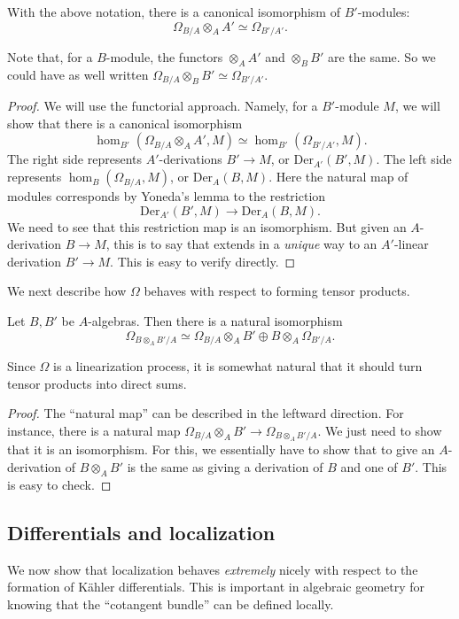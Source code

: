 \begin{proposition} \label{basechangediff} With the above notation, there is a canonical isomorphism
of $B'$-modules:
\[ \Omega_{B/A} \otimes_A A' \simeq \Omega_{B'/A'}.  \]
\end{proposition} 
Note that, for a $B$-module, the functors $\otimes_A A'$ and $\otimes_B B'$ are
the same. So we could have as well written $\Omega_{B/A} \otimes_B B' \simeq
\Omega_{B'/A'}$.
\begin{proof} 
We will use the functorial approach. Namely, for a $B'$-module $M$, we will
show that there is a canonical isomorphism
\[ \hom_{B'}( \Omega_{B/A} \otimes_A A', M) \simeq 
\hom_{B'}( \Omega_{B'/A'}, M) .
\]
The right side represents $A'$-derivations $B' \to M$, or $\mathrm{Der}_{A'}(B', M)$.
The left side represents $\hom_B(\Omega_{B/A}, M)$, or $\mathrm{Der}_A(B, M)$.
Here the natural map of modules corresponds by Yoneda's lemma to the restriction
\[ \mathrm{Der}_{A'}(B', M) \to \mathrm{Der}_A(B, M).  \]
We need to see that this restriction map is an isomorphism. But given an
$A$-derivation $B \to M$, this is to say that extends in a \emph{unique} way to
an $A'$-linear derivation $B' \to M$. This is easy to verify directly.
\end{proof} 

We next describe how $\Omega$ behaves with respect to forming tensor products.
\begin{proposition} 
Let $B, B'$ be $A$-algebras. Then there is a natural isomorphism
\[ \Omega_{B \otimes_A B'/A} \simeq \Omega_{B/A} \otimes_A B' \oplus B
\otimes_A \Omega_{B'/A} .  \]
\end{proposition}
Since $\Omega$ is a linearization process, it is somewhat natural that it
should turn tensor products into direct sums. 
\begin{proof} 
The ``natural map'' can be described in the leftward direction. For instance,
there is a natural map $\Omega_{B/A} \otimes_A B' \to \Omega_{B \otimes_A
B'/A}$. We just need to show that it is an isomorphism. 
For this, we essentially have to show that to give an $A$-derivation of $B
\otimes_A B'$ is the same as giving a derivation of $B$ and one of $B'$. This
is easy to check.
\end{proof} 

\subsection{Differentials and localization}
We now show that localization behaves \emph{extremely} nicely with respect to
the formation of K\"ahler differentials. This is important in algebraic
geometry for knowing that the ``cotangent bundle'' can be defined locally.

